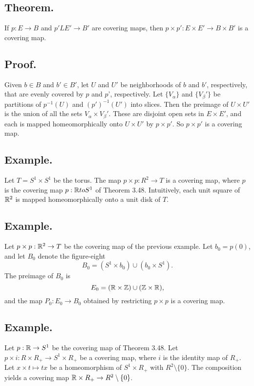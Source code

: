 \documentclass[titlepage]{article}
\begin{document}
\subsection{Theorem.} If $p: E \to B$ and $p'L E' \to B'$ are covering maps, then 
$p \times p': E \times E' \to B \times B'$ is a covering map.

\subsection{Proof.} Given $b \in B$ and $b' \in B'$, let $U$ and $U'$ be neighborhoods of $b$ and $b'$, respectively, that are evenly covered by $p$ and $p$', respectively. Let $\{V_{\alpha}\}$ and $\{V_{\beta}'\}$ be partitions of $p^{-1}(U)$ and $(p')^{-1}(U')$ into slices. Then the preimage of $U \times U'$ is the union of all the sets $V_{\alpha} \times V_{\beta}'$. These are disjoint open sets in $E \times E'$, and each is mapped homeomorphically onto $U \times U'$ by $p \times p'$. So $p \times p'$ is a covering map.

\subsection{Example.} Let $T = S^{1} \times S^{1}$ be the torus. The map $p \times p: R^{2} \to T$ is a covering map, where $p$ is the covering map $p: \mathbb{R} to S^{1}$ of Theorem 3.48. Intuitively, each unit square of $\mathbb{R}^{2}$ is mapped homeomorphically onto a unit disk of $T$.

\subsection{Example.} Let $p \times p: \mathbb{R}^{2} \to T$ be the covering map of the previous example. Let $b_{0} = p(0)$, and let $B_{0}$ denote the figure-eight 
$$B_{0} = (S^{1} \times b_{0}) \cup (b_{0} \times S^{1}).$$
The preimage of $B_{0}$ is 
$$E_{0} = (\mathbb{R} \times \mathbb{Z}) \cup (\mathbb{Z} \times \mathbb{R}),$$
and the map $P_{0}: E_{0} \to B_{0}$ obtained by restricting $p \times p$ is a covering map.

\subsection{Example.} Let $p: \mathbb{R} \to S^{1}$ be the covering map of Theorem 3.48. Let $p \times i: R \times R_{+} \to S^{1} \times R_{+}$ be a covering map, where $i$ is the identity map of $R_{+}$. Let $x \times t \mapsto tx$ be a homeomorphism of $S^{1} \times R_{+}$ with $R^{2} \setminus \{0\}$. The composition yields a covering map $\mathbb{R} \times R_{+} \to R^{2} \setminus \{0\}$.
\end{document}
